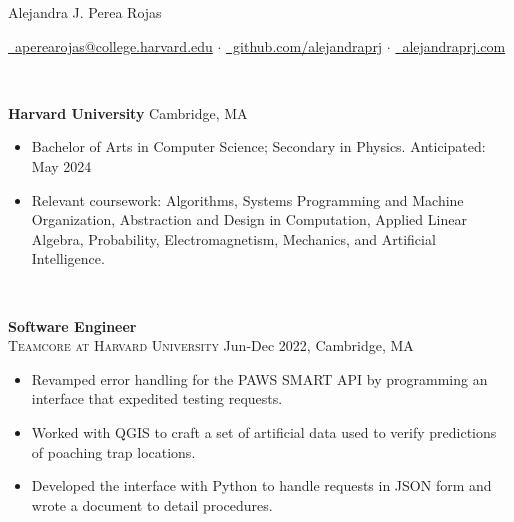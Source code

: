 \documentclass[11pt]{article}
\begin{document}
  \centerline{\Large{Alejandra J. Perea Rojas}}\vspace{1mm}

  \centerline{
    \href{mailto:aperearojas@college.harvard.edu}{\faEnvelopeO~aperearojas@college.harvard.edu} 
    $\cdot$ \href{https://github.com/alejandraprj}{\faGithub~github.com/alejandraprj}
    $\cdot$ \href{https://alejandraprj.com}{\faGlobe~alejandraprj.com}
  }\vspace{2mm}

  \vspace{-7pt}\\
  \noindent\makebox[\linewidth]{\rule{7.5in}{0.3pt}}

  \noindent \textbf{Harvard University} \hfill Cambridge, MA
    \begin{itemize}[itemsep=-.4em, leftmargin=1em]\vspace{-2mm}
        \item Bachelor of Arts in Computer Science; Secondary in Physics. \hfill Anticipated: May 2024
        \item Relevant coursework: 
          Algorithms, 
          Systems Programming and Machine Organization,
          Abstraction and Design in Computation, 
          Applied Linear Algebra, Probability,
          Electromagnetism, Mechanics, 
          and Artificial Intelligence.
    \end{itemize}

  \vspace{-7pt}\\
  \noindent\makebox[\linewidth]{\rule{7.5in}{0.3pt}}

    \noindent \textbf{Software Engineer}\\
    \textsc{{Teamcore at Harvard University}} \hfill Jun-Dec 2022, Cambridge, MA
    \begin{itemize}[itemsep=-.4em, leftmargin=1em]\vspace{-2mm}
      \item Revamped error handling for the PAWS SMART API by programming an interface that expedited testing requests. 
      \item Worked with QGIS to craft a set of artificial data used to verify predictions of poaching trap locations.
      \item Developed the interface with Python to handle requests in JSON form and wrote a document to detail procedures.
    \end{itemize}
    
\end{document}
